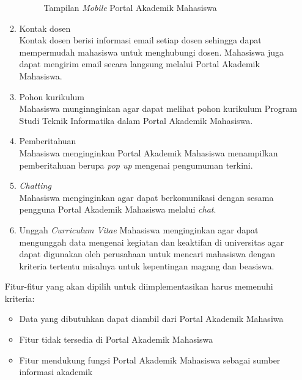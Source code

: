 \documentclass[a4paper,twoside]{article}
\begin{document}
\begin{enumerate}
\begin{enumerate}
\begin{figure}[H]
			\caption{Tampilan \textit{Mobile} Portal Akademik Mahasiswa} 
			\label{fig:3_pam_mobile}
		\end{figure}
	\item Kontak dosen\\
	Kontak dosen berisi informasi email setiap dosen sehingga dapat mempermudah mahasiswa untuk menghubungi dosen. Mahasiswa juga dapat mengirim email secara langsung melalui Portal Akademik Mahasiswa.
	\item Pohon kurikulum\\
	Mahasiswa munginnginkan agar dapat melihat pohon kurikulum Program Studi Teknik Informatika dalam Portal Akademik Mahasiswa.
	\item Pemberitahuan\\
	Mahasiswa menginginkan Portal Akademik Mahasiswa menampilkan pemberitahuan berupa \textit{pop up} mengenai pengumuman terkini.
	\item \textit{Chatting}\\
	Mahasiswa menginginkan agar dapat berkomunikasi dengan sesama pengguna Portal Akademik Mahasiswa melalui \textit{chat}.
	\item Unggah \textit{Curriculum Vitae}
	Mahasiswa menginginkan agar dapat mengunggah data mengenai kegiatan dan keaktifan di universitas agar dapat digunakan oleh perusahaan untuk mencari mahasiswa dengan kriteria tertentu misalnya untuk kepentingan magang dan beasiswa.
\end{enumerate}

Fitur-fitur yang akan dipilih untuk diimplementasikan harus memenuhi kriteria:
\begin{itemize}
	\item Data yang dibutuhkan dapat diambil dari Portal Akademik Mahasiwa
	\item Fitur tidak tersedia di Portal Akademik Mahasiswa
	\item Fitur mendukung fungsi Portal Akademik Mahasiswa sebagai sumber informasi akademik
\end{itemize}


\end{enumerate}
\end{document}
